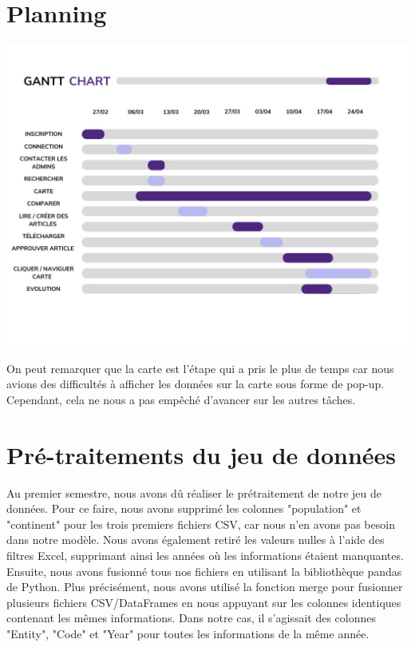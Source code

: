 \documentclass[12pt,a4paper]{report}
\begin{document}
\section{Planning}
    \begin{center}
        \includegraphics[width=1\textwidth]{images/gantt.jpg}
    \end{center}

    On peut remarquer que la carte est l'étape qui a pris le plus de temps car nous avions des difficultés à afficher les données sur la carte sous forme de pop-up. Cependant, cela ne nous a pas empêché d'avancer sur les autres tâches.
\vspace{0.5cm}
\section{Pré-traitements du jeu de données}
\vspace{0.5cm}

  Au premier semestre, nous avons dû réaliser le prétraitement de notre jeu de données. Pour ce faire, nous avons supprimé les colonnes "population" et "continent" pour les trois premiers fichiers CSV, car nous n'en avons pas besoin dans notre modèle. Nous avons également retiré les valeurs nulles à l'aide des filtres Excel, supprimant ainsi les années où les informations étaient manquantes. \\
  
  Ensuite, nous avons fusionné tous nos fichiers en utilisant la bibliothèque pandas de Python. Plus précisément, nous avons utilisé la fonction merge pour fusionner plusieurs fichiers CSV/DataFrames en nous appuyant sur les colonnes identiques contenant les mêmes informations. Dans notre cas, il s'agissait des colonnes "Entity", "Code" et "Year" pour toutes les informations de la même année. \\
\end{document}
